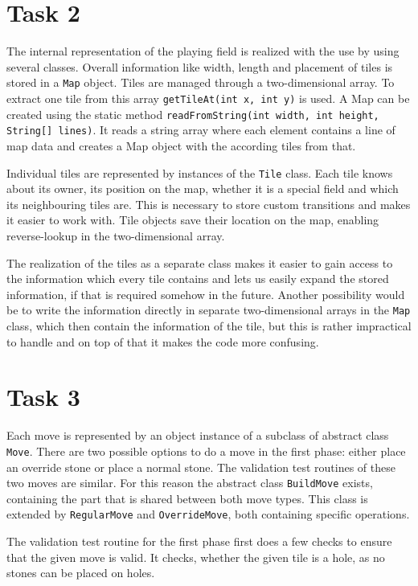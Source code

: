 \section{Task 2}
The internal representation of the playing field is realized with the use by using several classes. Overall information like width, length and placement of tiles is stored in a \texttt{Map} object. Tiles are managed through a two-dimensional array. To extract one tile from this array \lstinline{getTileAt(int x, int y)} is used. A Map can be created using the static method \lstinline{readFromString(int width, int height, String[] lines)}. It reads a string array where each element contains a line of map data and creates a Map object with the according tiles from that.

Individual tiles are represented by instances of the \texttt{Tile} class. Each tile knows about its owner, its position on the map, whether it is a special field and which its neighbouring tiles are. This is necessary to store custom transitions and makes it easier to work with. Tile objects save their location on the map, enabling reverse-lookup in the two-dimensional array.

The realization of the tiles as a separate class makes it easier to gain access to the information which every tile contains and lets us easily expand the stored information, if that is required somehow in the future. Another possibility would be to write the information directly in separate two-dimensional arrays in the \texttt{Map} class, which then contain the information of the tile, but this is rather impractical to handle and on top of that it makes the code more confusing.

\section{Task 3}
Each move is represented by an object instance of a subclass of abstract class \texttt{Move}. There are two possible options to do a move in the first phase: either place an override stone or place a normal stone. 
The validation test routines of these two moves are similar. For this reason the abstract class \texttt{BuildMove} exists, containing the part that is shared between both move types. This class is extended by \texttt{RegularMove} and \texttt{OverrideMove}, both containing specific operations.

The validation test routine for the first phase first does a few checks to ensure that the given move is valid. It checks, whether the given tile is a hole, as no stones can be placed on holes.

